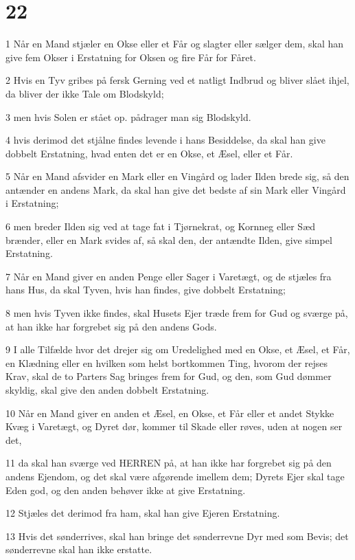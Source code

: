 \chapter{22}

\par 1 Når en Mand stjæler en Okse eller et Får og slagter eller sælger dem, skal han give fem Okser i Erstatning for Oksen og fire Får for Fåret.
\par 2 Hvis en Tyv gribes på fersk Gerning ved et natligt Indbrud og bliver slået ihjel, da bliver der ikke Tale om Blodskyld;
\par 3 men hvis Solen er stået op. pådrager man sig Blodskyld.
\par 4 hvis derimod det stjålne findes levende i hans Besiddelse, da skal han give dobbelt Erstatning, hvad enten det er en Okse, et Æsel, eller et Får.
\par 5 Når en Mand afsvider en Mark eller en Vingård og lader Ilden brede sig, så den antænder en andens Mark, da skal han give det bedste af sin Mark eller Vingård i Erstatning;
\par 6 men breder Ilden sig ved at tage fat i Tjørnekrat, og Kornneg eller Sæd brænder, eller en Mark svides af, så skal den, der antændte Ilden, give simpel Erstatning.
\par 7 Når en Mand giver en anden Penge eller Sager i Varetægt, og de stjæles fra hans Hus, da skal Tyven, hvis han findes, give dobbelt Erstatning;
\par 8 men hvis Tyven ikke findes, skal Husets Ejer træde frem for Gud og sværge på, at han ikke har forgrebet sig på den andens Gods.
\par 9 I alle Tilfælde hvor det drejer sig om Uredelighed med en Okse, et Æsel, et Får, en Klædning eller en hvilken som helst bortkommen Ting, hvorom der rejses Krav, skal de to Parters Sag bringes frem for Gud, og den, som Gud dømmer skyldig, skal give den anden dobbelt Erstatning.
\par 10 Når en Mand giver en anden et Æsel, en Okse, et Får eller et andet Stykke Kvæg i Varetægt, og Dyret dør, kommer til Skade eller røves, uden at nogen ser det,
\par 11 da skal han sværge ved HERREN på, at han ikke har forgrebet sig på den andens Ejendom, og det skal være afgørende imellem dem; Dyrets Ejer skal tage Eden god, og den anden behøver ikke at give Erstatning.
\par 12 Stjæles det derimod fra ham, skal han give Ejeren Erstatning.
\par 13 Hvis det sønderrives, skal han bringe det sønderrevne Dyr med som Bevis; det sønderrevne skal han ikke erstatte.
